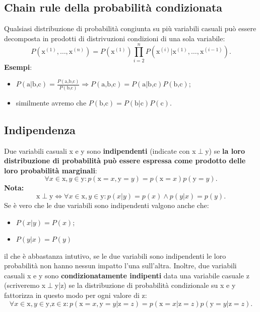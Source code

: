\subsection{Chain rule della probabilità condizionata}
Qualsiasi distribuzione di probabilità congiunta su più variabili casuali può essere decomposta in prodotti di distrivuzioni condizioni di una sola variabile:
\begin{equation}
    P(\text{x}^{(1)},\dots,\text{x}^{(n)})=P(\text{x}^{(1)})\prod^n_{i=2}P(\text{x}^{(i)}|\text{x}^{(1)},\dots,\text{x}^{(i-1)}).
\end{equation}
\textbf{Esempi}:
\begin{itemize}
    \item $P(\text{a}|\text{b,c})=\frac{P(\text{a,b,c})}{P(\text{b,c})} \Rightarrow P(\text{a,b,c})=P(\text{a$|$b,c})P(\text{b,c})$;
    \item similmente avremo che $P(\text{b,c})=P(\text{b$|$c})P(\text{c})$.
\end{itemize}
\subsection{Indipendenza}
Due variabili casuali x e y sono \textbf{indipendenti} (indicate con x$\perp$y) se \textbf{la loro distribuzione di probabilità può essere espressa come prodotto delle loro probabilità marginali}:
\begin{equation}
    \forall x\in \text{x},y\in \text{y}:p(\text{x}=x,\text{y}=y)=p(\text{x}=x)p(\text{y}=y).
\end{equation}
\textbf{Nota:}
\begin{equation}
    \text{x}\perp\text{y}\Longleftrightarrow \forall x\in \text{x},y\in \text{y}:p(x|y)=p(x) \wedge p(y|x)=p(y).
\end{equation}
Se è vero che le due variabili sono indipendenti valgono anche che:
\begin{itemize}
    \item $P(x|y)=P(x)$;
    \item $P(y|x)=P(y)$
\end{itemize}
il che è abbastanza intutivo, se le due variabili sono indipendenti le loro probabilità non hanno nessun impatto l'una sull'altra.
Inoltre, due variabili casuali x e y sono \textbf{condizionatamente indipenti} data una variabile casuale z (scriveremo x$\perp$y|z) se la distribuzione di probabilità condizionale su x e y fattorizza in questo modo per ogni valore di z:
\begin{equation}
    \forall x\in \text{x},y\in \text{y,z}\in \text{z}:p(\text{x}=x,\text{y}=y|\text{z}=z)=p(\text{x}=x|\text{z}=z)p(\text{y}=y|\text{z}=z).
\end{equation}

